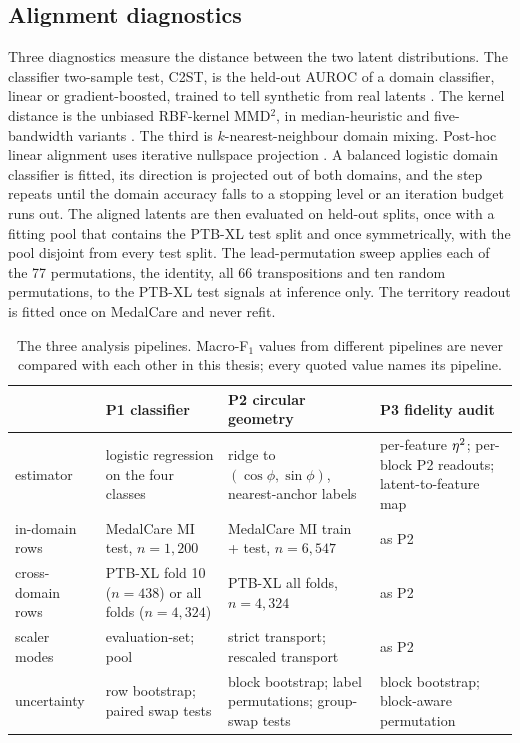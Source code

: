 \subsection{Alignment diagnostics}
\label{sec:align-method}
Three diagnostics measure the distance between the two latent distributions. The classifier two-sample test, C2ST, is the held-out AUROC of a domain classifier, linear or gradient-boosted, trained to tell synthetic from real latents \citep{lopezpaz2017c2st}. The kernel distance is the unbiased RBF-kernel MMD$^2$, in median-heuristic and five-bandwidth variants \citep{gretton2012kernel}. The third is $k$-nearest-neighbour domain mixing. Post-hoc linear alignment uses iterative nullspace projection \citep{ravfogel2020null}. A balanced logistic domain classifier is fitted, its direction is projected out of both domains, and the step repeats until the domain accuracy falls to a stopping level or an iteration budget runs out. The aligned latents are then evaluated on held-out splits, once with a fitting pool that contains the PTB-XL test split and once symmetrically, with the pool disjoint from every test split. The lead-permutation sweep applies each of the 77 permutations, the identity, all 66 transpositions and ten random permutations, to the PTB-XL test signals at inference only. The territory readout is fitted once on MedalCare and never refit. 

\begin{table}[tb]
\centering\small
\caption{The three analysis pipelines. Macro-F$_1$ values from different pipelines are never compared with each other in this thesis; every quoted value names its pipeline.}
\label{tab:pipelines}
\begin{tabular}{P{2.4cm}P{3.4cm}P{3.5cm}P{3.9cm}}
\toprule
 & P1 classifier & P2 circular geometry & P3 fidelity audit \\
\midrule
estimator & logistic regression on the four classes & ridge to $(\cos\phi,\sin\phi)$, nearest-anchor labels & per-feature $\eta^{2}$; per-block P2 readouts; latent-to-feature map \\
in-domain rows & MedalCare MI test, $n=1{,}200$ & MedalCare MI train + test, $n=6{,}547$ & as P2 \\
cross-domain rows & PTB-XL fold 10 ($n=438$) or all folds ($n=4{,}324$) & PTB-XL all folds, $n=4{,}324$ & as P2 \\
scaler modes & evaluation-set; pool & strict transport; rescaled transport & as P2 \\
uncertainty & row bootstrap; paired swap tests & block bootstrap; label permutations; group-swap tests & block bootstrap; block-aware permutation \\
\bottomrule
\end{tabular}
\end{table}

